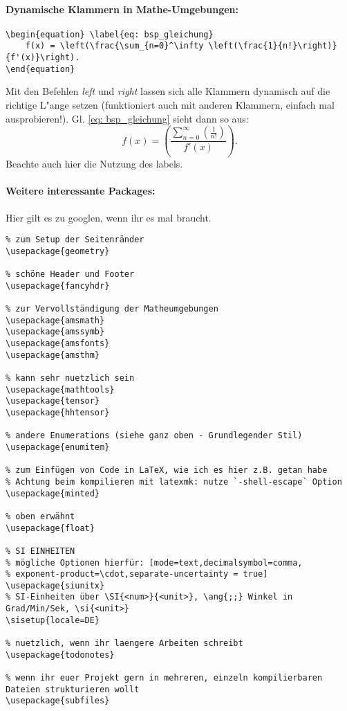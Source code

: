 \documentclass[11pt, a4paper]{article}
\begin{document}
	\paragraph{Dynamische Klammern in Mathe-Umgebungen:}
	\begin{verbatim}
\begin{equation} \label{eq: bsp_gleichung}
    f(x) = \left(\frac{\sum_{n=0}^\infty \left(\frac{1}{n!}\right)}{f'(x)}\right).
\end{equation}
	\end{verbatim}
    Mit den Befehlen \emph{left} und \emph{right} lassen sich alle Klammern dynamisch auf die richtige L"ange setzen (funktioniert auch mit anderen Klammern, einfach mal ausprobieren!). Gl. \eqref{eq: bsp_gleichung} sieht dann so aus:
	\begin{equation} \label{eq: bsp_gleichung}
		f(x) = \left(\frac{\sum_{n=0}^\infty \left(\frac{1}{n!}\right)}{f'(x)}\right).
	\end{equation}
	Beachte auch hier die Nutzung des labels.

	\paragraph{Weitere interessante Packages:}
	Hier gilt es zu googlen, wenn ihr es mal braucht.
	\begin{verbatim}
% zum Setup der Seitenränder
\usepackage{geometry}

% schöne Header und Footer
\usepackage{fancyhdr}

% zur Vervollständigung der Matheumgebungen
\usepackage{amsmath}
\usepackage{amssymb}
\usepackage{amsfonts}
\usepackage{amsthm}

% kann sehr nuetzlich sein
\usepackage{mathtools}
\usepackage{tensor}
\usepackage{hhtensor}

% andere Enumerations (siehe ganz oben - Grundlegender Stil)
\usepackage{enumitem}

% zum Einfügen von Code in LaTeX, wie ich es hier z.B. getan habe
% Achtung beim kompilieren mit latexmk: nutze `-shell-escape` Option
\usepackage{minted}

% oben erwähnt
\usepackage{float}

% SI EINHEITEN
% mögliche Optionen hierfür: [mode=text,decimalsymbol=comma,
% exponent-product=\cdot,separate-uncertainty = true]
\usepackage{siunitx}
% SI-Einheiten über \SI{<num>}{<unit>}, \ang{;;} Winkel in Grad/Min/Sek, \si{<unit>}
\sisetup{locale=DE}

% nuetzlich, wenn ihr laengere Arbeiten schreibt
\usepackage{todonotes}

% wenn ihr euer Projekt gern in mehreren, einzeln kompilierbaren Dateien strukturieren wollt
\usepackage{subfiles}
	\end{verbatim}
\end{document}
